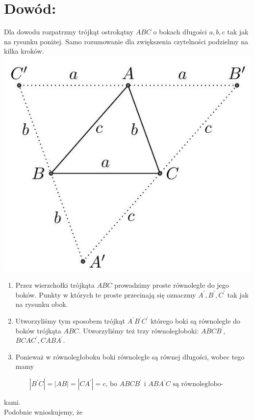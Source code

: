 \documentclass[10pt]{article}
\begin{document}
\section*{Dowód:}
Dla dowodu rozpatrzmy trójkąt ostrokątny \(A B C\) o bokach długości \(a, b, c\) tak jak na rysunku poniżej. Samo rozumowanie dla zwiększenia czytelności podzielmy na kilka kroków.\\
\includegraphics[max width=\textwidth, center]{2024_11_21_71f62bd117d375398909g-157(2)}

\begin{enumerate}
  \item Przez wierzchołki trójkąta \(A B C\) prowadzimy proste równoległe do jego boków. Punkty w których te proste przecinają się oznaczmy \(A^{\prime}, B^{\prime}, C^{\prime}\) tak jak na rysunku obok.
  \item Utworzyliśmy tym sposobem trójkąt \(A^{\prime} B^{\prime} C^{\prime}\) którego boki są równoległe do boków trójkąta \(A B C\). Utworzyliśmy też trzy równoległoboki: \(A B C B^{\prime}\), \(B C A C^{\prime}, C A B A^{\prime}\).
  \item Ponieważ w równoległoboku boki równoległe są równej długości, wobec tego mamy
\end{enumerate}

\[
\left|B^{\prime} C\right|=|A B|=\left|C A^{\prime}\right|=c \text {, bo } A B C B^{\prime} \text { i } A B A^{\prime} C \text { są równoległobo- }
\]

kami.\\
Podobnie wnioskujemy, że
\end{document}
